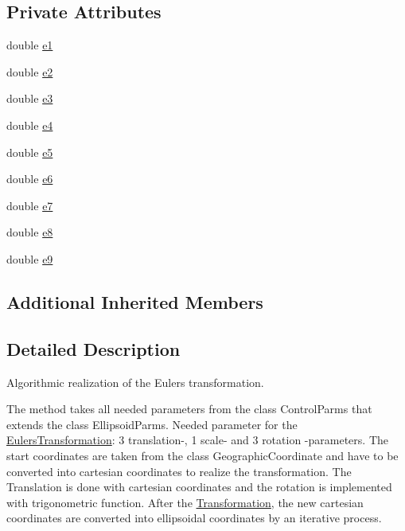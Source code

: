 \subsection*{Private Attributes}
\begin{DoxyCompactItemize}
\item 
double \hyperlink{classdatumstrategy_1_1_eulers_transformation_a2e8c6f2458ddf01b4b46bc3800c13363}{e1}
\item 
double \hyperlink{classdatumstrategy_1_1_eulers_transformation_a2337790869ae44252d7ac574bb748fad}{e2}
\item 
double \hyperlink{classdatumstrategy_1_1_eulers_transformation_a6e1425d38cd9762dc299779981fc1abe}{e3}
\item 
double \hyperlink{classdatumstrategy_1_1_eulers_transformation_a75850bab8cf460223edd241724c0fc65}{e4}
\item 
double \hyperlink{classdatumstrategy_1_1_eulers_transformation_aa9f067a6e627854bbcc06f9606535ad0}{e5}
\item 
double \hyperlink{classdatumstrategy_1_1_eulers_transformation_a4bf6b7004de7c30697305f2d306a28e9}{e6}
\item 
double \hyperlink{classdatumstrategy_1_1_eulers_transformation_a4faa97a258a45ffc8e3e2f801964b000}{e7}
\item 
double \hyperlink{classdatumstrategy_1_1_eulers_transformation_aa8c2fddfc3d1b5190eabe3ec5edc4aa3}{e8}
\item 
double \hyperlink{classdatumstrategy_1_1_eulers_transformation_a978ca17f76ae4e8497ca75010bf54b46}{e9}
\end{DoxyCompactItemize}
\subsection*{Additional Inherited Members}


\subsection{Detailed Description}
Algorithmic realization of the Euler\textquotesingle{}s transformation. 

The method takes all needed parameters from the class Control\+Parms that extends the class Ellipsoid\+Parms. Needed parameter for the \hyperlink{classdatumstrategy_1_1_eulers_transformation}{Eulers\+Transformation}\+: 3 translation-\/, 1 scale-\/ and 3 rotation -\/parameters. The start coordinates are taken from the class Geographic\+Coordinate and have to be converted into cartesian coordinates to realize the transformation. The Translation is done with cartesian coordinates and the rotation is implemented with trigonometric function. After the \hyperlink{class_transformation}{Transformation}, the new cartesian coordinates are converted into ellipsoidal coordinates by an iterative process.

